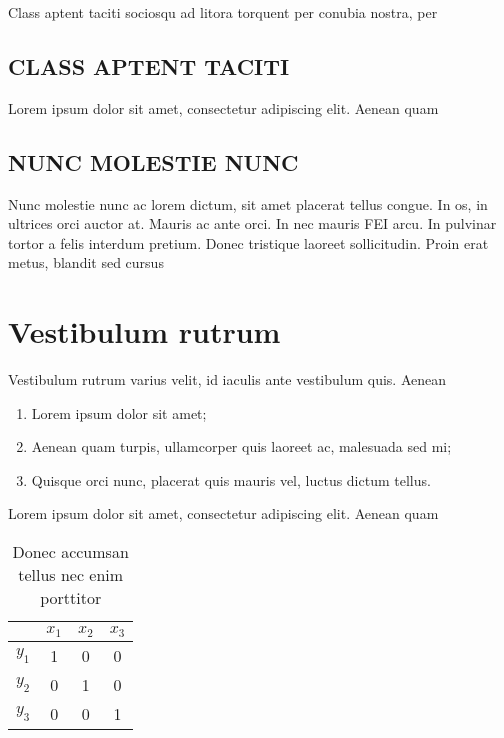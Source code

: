 \documentclass[acronym,symbols]{fei}
\begin{document}
Class aptent taciti sociosqu ad litora torquent per conubia nostra, per 

\section{CLASS APTENT TACITI}

Lorem ipsum dolor sit amet, consectetur adipiscing elit. Aenean quam 

\section{NUNC MOLESTIE NUNC}

Nunc molestie nunc ac lorem dictum, sit amet placerat tellus congue. In os, in ultrices orci auctor at. Mauris ac ante orci. In nec mauris FEI arcu. In pulvinar tortor a felis interdum pretium. Donec tristique laoreet sollicitudin. Proin erat metus, blandit sed cursus 

\chapter{Vestibulum rutrum}

Vestibulum rutrum varius velit, id iaculis ante vestibulum quis. Aenean 

\begin{enumerate}
  \item Lorem ipsum dolor sit amet;
  \item Aenean quam turpis, ullamcorper quis laoreet ac, malesuada sed mi;
  \item Quisque orci nunc, placerat quis mauris vel, luctus dictum tellus.
\end{enumerate}

Lorem ipsum dolor sit amet, consectetur adipiscing elit. Aenean quam 

\begin{table}[ht!]
  \caption{Donec accumsan tellus nec enim porttitor}%
  \label{tbl:exemplo}
  \centering
  \begin{tabular}{|c|c|c|c|}
    \hline
            & \(x_1\) & \(x_2\) & \(x_3\) \\
    \hline
    \(y_1\) & 1       & 0       & 0       \\
    \hline
    \(y_2\) & 0       & 1       & 0       \\
    \hline
    \(y_3\) & 0       & 0       & 1       \\
    \hline
  \end{tabular}
\end{table}
\end{document}

